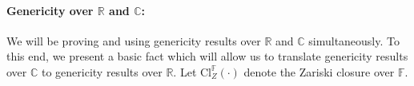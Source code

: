 \documentclass[11pt]{article}
\theoremstyle{definition}
\newtheorem{fact}[theorem]{Fact}
\newcommand{\setft}[1]{\mathrm{#1}}
\newcommand{\complex}{\mathbb{C}}
\newcommand{\field}{\mathbb{F}}
\newcommand{\real}{\mathbb{R}}
\newcommand\A{\mathcal{A}}
\newcommand\Sp{\mathcal{S}}
\newcommand\T{\mathcal{T}}
\def\ba#1\ea{\begin{align}#1\end{align}}
\begin{document}
\paragraph{Genericity over $\real$ and $\complex$:} We will be proving and using genericity results over $\real$ and $\complex$ simultaneously. To this end, we present a basic fact which will allow us to translate genericity results over $\complex$ to genericity results over $\real$. Let $\setft{Cl}_Z^{\field}(\cdot)$ denote the Zariski closure over $\field$.
%
\end{document}
